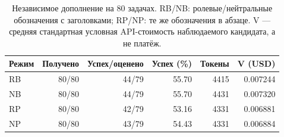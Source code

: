 \begin{table}[t]\centering\small
\caption{Независимое дополнение на 80 задачах. RB/NB: ролевые/нейтральные обозначения с заголовками; RP/NP: те же обозначения в абзаце. V --- средняя стандартная условная API-стоимость наблюдаемого кандидата, а не платёж.}\label{tab:seg80-groups}
\begin{tabular*}{\linewidth}{@{\extracolsep{\fill}}lrrrrr}\toprule
Режим & Получено & Успех/оценено & Успех (\%) & Токены & V (USD)\\
\midrule
RB & 80/80 & 44/79 & 55.70 & 4415 & 0.007244\\
NB & 80/80 & 44/79 & 55.70 & 4431 & 0.007320\\
RP & 80/80 & 42/79 & 53.16 & 4331 & 0.006881\\
NP & 80/80 & 43/79 & 54.43 & 4331 & 0.006884\\
\bottomrule\end{tabular*}\end{table}
